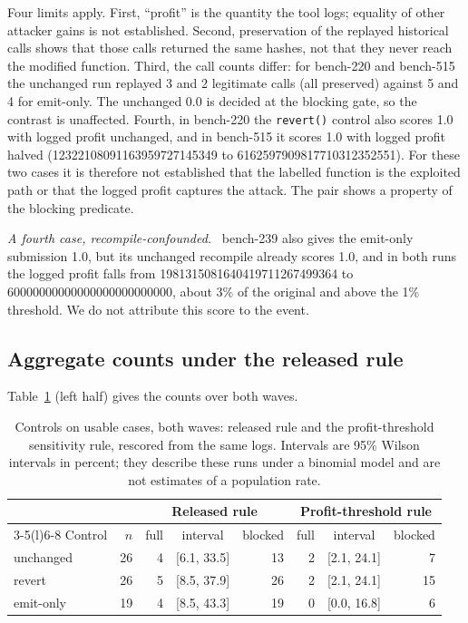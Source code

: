 \documentclass[conference]{IEEEtran}
\newcommand{\code}[1]{\texttt{#1}}
\newcommand{\para}[1]{\textit{#1.}\ }
\begin{document}
Four limits apply. First, ``profit'' is the quantity the tool logs; equality of other attacker gains is not established. Second, preservation of the replayed historical calls shows that those calls returned the same hashes, not that they never reach the modified function. Third, the call counts differ: for bench-220 and bench-515 the unchanged run replayed 3 and 2 legitimate calls (all preserved) against 5 and 4 for emit-only. The unchanged 0.0 is decided at the blocking gate, so the contrast is unaffected. Fourth, in bench-220 the \code{revert()} control also scores 1.0 with logged profit unchanged, and in bench-515 it scores 1.0 with logged profit halved (12322108091163959727145349 to 6162597909817710312352551). For these two cases it is therefore not established that the labelled function is the exploited path or that the logged profit captures the attack. The pair shows a property of the blocking predicate.

\para{A fourth case, recompile-confounded} bench-239 also gives the emit-only submission 1.0, but its unchanged recompile already scores 1.0, and in both runs the logged profit falls from 1981315081640419711267499364 to 60000000000000000000000000, about 3\% of the original and above the 1\% threshold. We do not attribute this score to the event.

\subsection{Aggregate counts under the released rule}
Table~\ref{tab:results} (left half) gives the counts over both waves.

\begin{table}[t]
\caption{Controls on usable cases, both waves: released rule and the profit-threshold sensitivity rule, rescored from the same logs. Intervals are 95\% Wilson intervals in percent; they describe these runs under a binomial model and are not estimates of a population rate.}
\label{tab:results}
\centering
\footnotesize
\setlength{\tabcolsep}{2.5pt}
\begin{tabular}{@{}lrrcrrcr@{}}
\toprule
 & & \multicolumn{3}{c}{Released rule} & \multicolumn{3}{c}{Profit-threshold rule} \\
\cmidrule(lr){3-5}\cmidrule(l){6-8}
Control & $n$ & full & interval & blocked & full & interval & blocked \\
\midrule
unchanged & 26 & 4 & [6.1, 33.5] & 13 & 2 & [2.1, 24.1] & 7 \\
revert    & 26 & 5 & [8.5, 37.9] & 26 & 2 & [2.1, 24.1] & 15 \\
emit-only & 19 & 4 & [8.5, 43.3] & 19 & 0 & [0.0, 16.8] & 6 \\
\bottomrule
\end{tabular}
\end{table}
\end{document}
